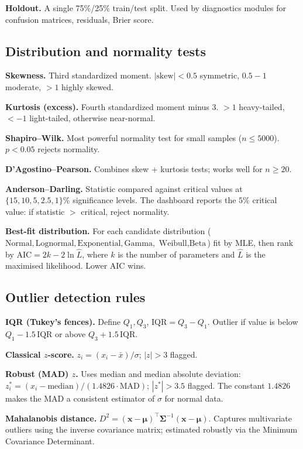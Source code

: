 \documentclass[11pt,a4paper]{article}
\begin{document}
\textbf{Holdout.} A single 75\%/25\% train/test split. Used by
diagnostics modules for confusion matrices, residuals, Brier score.

\subsection{Distribution and normality tests}

\textbf{Skewness.} Third standardized moment.
$|\text{skew}| < 0.5$ symmetric, $0.5\!-\!1$ moderate, $>1$ highly skewed.

\textbf{Kurtosis (excess).} Fourth standardized moment minus 3.
$>1$ heavy-tailed, $<-1$ light-tailed, otherwise near-normal.

\textbf{Shapiro--Wilk.} Most powerful normality test for small samples
($n \leq 5000$). $p < 0.05$ rejects normality.

\textbf{D'Agostino--Pearson.} Combines skew + kurtosis tests; works well for
$n \geq 20$.

\textbf{Anderson--Darling.} Statistic compared against critical values at
$\{15, 10, 5, 2.5, 1\}$\% significance levels. The dashboard reports the
$5\%$ critical value: if statistic $>$ critical, reject normality.

\textbf{Best-fit distribution.} For each candidate distribution
($\text{Normal}, \text{Lognormal}, \text{Exponential}, \text{Gamma},$
$\text{Weibull}, \text{Beta}$) fit by MLE, then rank by
$\mathrm{AIC} = 2k - 2\ln\hat{L}$, where $k$ is the number of parameters
and $\hat{L}$ is the maximised likelihood. Lower AIC wins.

\subsection{Outlier detection rules}

\textbf{IQR (Tukey's fences).} Define $Q_1, Q_3$, $\mathrm{IQR} = Q_3 - Q_1$.
Outlier if value is below $Q_1 - 1.5\,\mathrm{IQR}$ or above
$Q_3 + 1.5\,\mathrm{IQR}$.

\textbf{Classical $z$-score.} $z_i = (x_i - \bar{x}) / \sigma$;
$|z| > 3$ flagged.

\textbf{Robust (MAD) $z$.} Uses median and median absolute deviation:
$z^*_i = (x_i - \text{median}) / (1.4826 \cdot \text{MAD})$;
$|z^*| > 3.5$ flagged. The constant $1.4826$ makes the MAD a consistent
estimator of $\sigma$ for normal data.

\textbf{Mahalanobis distance.}
$D^2 = (\mathbf{x} - \boldsymbol{\mu})^\top \boldsymbol{\Sigma}^{-1}
(\mathbf{x} - \boldsymbol{\mu})$. Captures multivariate outliers using the
inverse covariance matrix; estimated robustly via the Minimum Covariance
Determinant.
\end{document}
